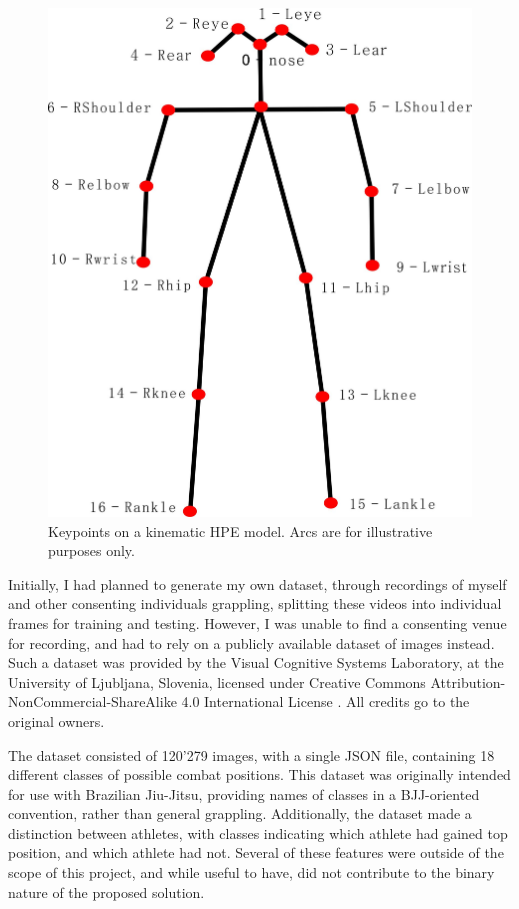 \documentclass[a4paper, oneside, 11pt]{article}
\begin{document}
\bigskip
\begin{figure}[h]
    \centering
    \includegraphics[scale = 0.47]{img/ms-coco.png}
    \caption{Keypoints on a kinematic HPE model. Arcs are for illustrative purposes only.}
    \label{fig:keypoints}
\end{figure}

\bigskip
\noindent
Initially, I had planned to generate my own dataset, through recordings of myself and other consenting individuals grappling, splitting these videos into individual frames for training and testing. However, I was unable to find a consenting venue for recording, and had to rely on a publicly available dataset of images instead.
Such a dataset was provided by the Visual Cognitive Systems Laboratory, at the University of Ljubljana, Slovenia, licensed under Creative Commons Attribution-NonCommercial-ShareAlike 4.0 International License \cite{IdentifyingBJJPositions}. All credits go to the original owners.

\bigskip
\noindent
The dataset consisted of 120'279 images, with a single JSON file, containing 18 different classes of possible combat positions. This dataset was originally intended for use with Brazilian Jiu-Jitsu, providing names of classes in a BJJ-oriented convention, rather than general grappling. Additionally, the dataset made a distinction between athletes, with classes indicating which athlete had gained top position, and which athlete had not. Several of these features were outside of the scope of this project, and while useful to have, did not contribute to the binary nature of the proposed solution.
\end{document}
